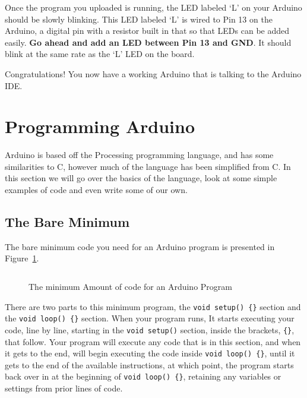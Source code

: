 \documentclass[11pt,a4paper]{article}
\begin{document}
Once the program you uploaded is running, the LED labeled `L' on your Arduino should be slowly blinking.  This LED labeled `L' is wired to Pin 13 on the Arduino, a digital pin with a resistor built in that so that LEDs can be added easily.  \textbf{Go ahead and add an LED between Pin 13 and GND}.  It should blink at the same rate as the `L' LED on the board.



Congratulations!  You now have a working Arduino that is talking to the Arduino IDE.


\section{Programming Arduino} %
\label{sec:programming_arduino}

Arduino is based off the Processing\cite{processing} programming language, and has some similarities to C, however much of the language has been simplified from C.  In this section we will go over the basics of the language, look at some simple examples of code and even write some of our own.

\subsection{The Bare Minimum} %
\label{sub:the_bare_minimum}

The bare minimum code you need for an Arduino program is presented in Figure~\ref{fig:bare}.

\begin{figure}[htbp]
	\centering
\inputminted[mathescape,linenos,numbersep=5pt,gobble=0,frame=lines,framesep=2mm]{c}{code/BareMinimum/BareMinimum.ino}
	\caption{The minimum Amount of code for an Arduino Program}
	\label{fig:bare}
\end{figure}

There are two parts to this minimum program, the \texttt{void setup() \{\}} section and the \texttt{void loop() \{\}} section.  When your program runs, It starts executing your code, line by line, starting in the \texttt{void setup()} section, inside the brackets, \texttt{\{\}}, that follow.  Your program will execute any code that is in this section, and when it gets to the end, will begin executing the code inside \texttt{void loop() \{\}}, until it gets to the end of the available instructions, at which point, the program starts back over in at the beginning of \texttt{void loop() \{\}}, retaining any variables or settings from prior lines of code.
\end{document}
